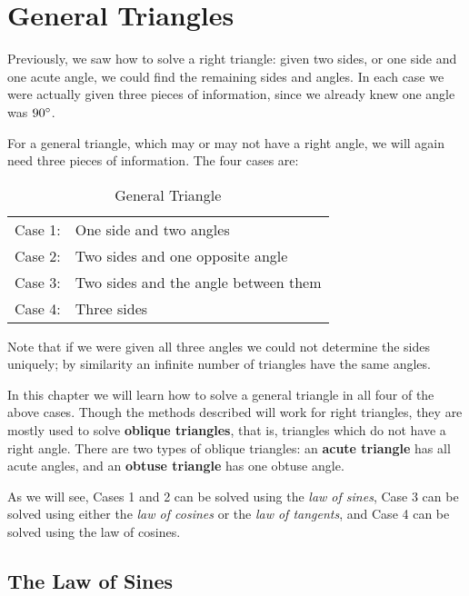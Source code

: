 \chapter{General Triangles}
Previously,  we saw how to solve a right triangle: given two sides, or one side
and one acute angle, we could find the remaining sides and angles. In each case we
were actually given three pieces of information, since we already knew one angle was $90^\circ$.

For a general triangle, which may or may not have a right angle, we will again need three pieces of
information. The four cases are:

\begin{table}[h]\centering
\begin{tabular}{ll}
Case 1: \enskip & One side and two angles\\
Case 2: \enskip & Two sides and one opposite angle\\
Case 3: \enskip & Two sides and the angle between them\\
Case 4: \enskip & Three sides\\
\end{tabular}
\caption{General Triangle}
\end{table}

Note that if we were given all three angles we could not determine the sides uniquely; by similarity
an infinite number of triangles have the same angles.

In this chapter we will learn how to solve a general triangle in all four of the above cases. Though
the methods described will work for right triangles, they are mostly used to solve
\textbf{oblique triangles}, that is, triangles which
do not have a right angle. There are two types of oblique triangles: an \textbf{acute triangle}
has all acute angles, and an \textbf{obtuse triangle} has one obtuse angle.

As we will see, Cases 1 and 2 can be solved using the \emph{law of sines}, Case
3 can be solved using either the \emph{law of cosines} or the \emph{law of tangents}, and Case 4 can
be solved using the law of cosines.

\section{The Law of Sines}

